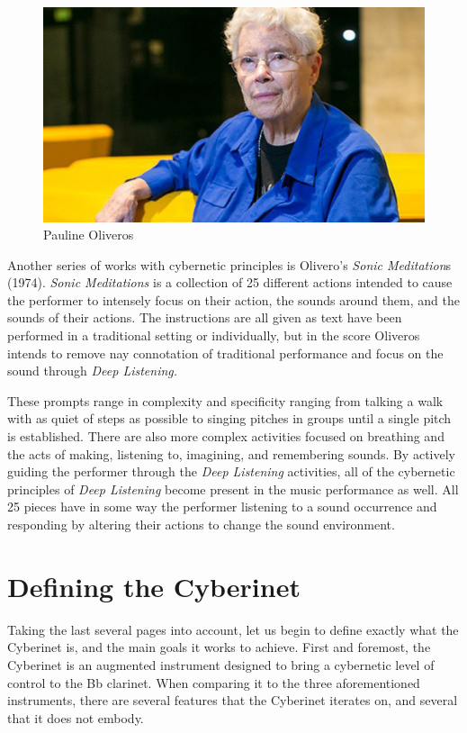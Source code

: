 \begin{figure}
    \centering
    \includegraphics[scale=0.25]{diagrams/oliveros.jpg}
    \caption{Pauline Oliveros}
    \label{fig:oliverosHS}
\end{figure}

Another series of works with cybernetic principles is Olivero's \textit{Sonic Meditation}s (1974). \textit{Sonic Meditations} is a collection of 25 different actions intended to cause the performer to intensely focus on their action, the sounds around them, and the sounds of their actions\cite{OliverosMeditations}. The instructions are all given as text have been performed in a traditional setting or individually, but in the score Oliveros intends to remove nay connotation of traditional performance and focus on the sound through \textit{Deep Listening.} 

These prompts range in complexity and specificity ranging from talking a walk with as quiet of steps as possible to singing pitches in groups until a single pitch is established. There are also more complex activities focused on breathing and the acts of making, listening to, imagining, and remembering sounds\cite{OliverosMeditations}. By actively guiding the performer through the \textit{Deep Listening} activities, all of the cybernetic principles of \textit{Deep Listening} become present in the music performance as well. All 25 pieces have in some way the performer listening to a sound occurrence and responding by altering their actions to change the sound environment.

\section{Defining the Cyberinet}


Taking the last several pages into account, let us begin to define exactly what the Cyberinet is, and the main goals it works to achieve. First and foremost, the Cyberinet is an augmented instrument designed to bring a cybernetic level of control to the Bb clarinet. When comparing it to the three aforementioned instruments, there are several features that the Cyberinet iterates on, and several that it does not embody.

